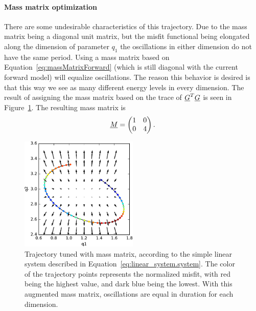 \paragraph{Mass matrix optimization}There are some undesirable characteristics of this trajectory. Due to the mass matrix being a diagonal unit matrix, but the misfit functional being elongated along the dimension of parameter $q_1$ the oscillations in either dimension do not have the same period. Using a mass matrix based on Equation~\eqref{eq:massMatrixForward} (which is still diagonal with the current forward model) will equalize oscillations. The reason this behavior is desired is that this way we see as many different energy levels in every dimension. The result of assigning the mass matrix based on the trace of $\underline{G}^T\underline{G}$ is seen in Figure~\ref{fig:linear_system.trajectory_massTuned}. The resulting mass matrix is ~
\begin{gather}\label{eq:linear_system.massMatrix}
\underline{M} = 
\begin{pmatrix}
1 & 0\\
0 & 4\\
\end{pmatrix}.
\end{gather}

\begin{figure}
	\centering
	
	\includegraphics[width=0.5\textwidth]{simple-linear-system/figures/trajectory_massTuned}
	
	\caption{Trajectory tuned with mass matrix, according to the simple linear system described in Equation~\eqref{eq:linear_system.system}. The color of the trajectory points represents the normalized misfit, with red being the highest value, and dark blue being the lowest. With this augmented mass matrix, oscillations are equal in duration for each dimension.}
	\label{fig:linear_system.trajectory_massTuned}
\end{figure}

